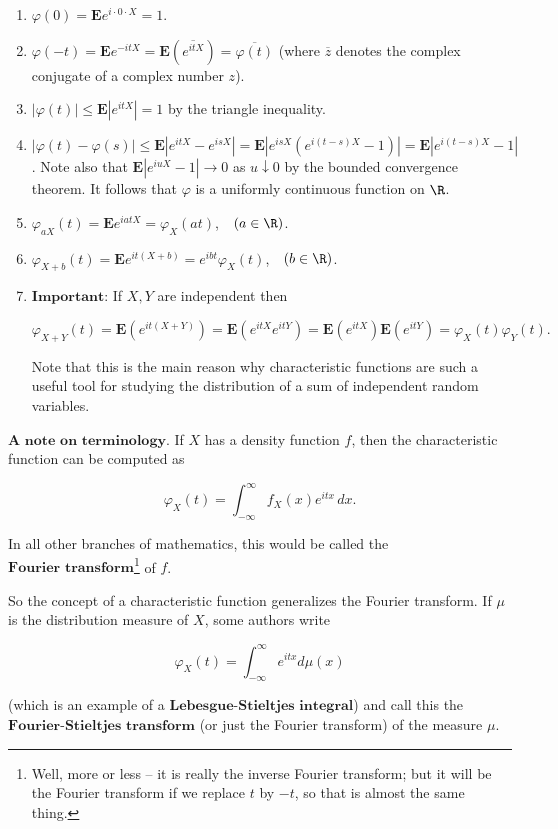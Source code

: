 \begin{enumerate}[label=\arabic*.]
\item $\varphi(0) = \mathbf{E} e^{i\cdot 0\cdot X} = 1$.

\item $\varphi(-t) = \mathbf{E} e^{-i t X} = \mathbf{E}
\left(\overline{e^{it X}}\right) =
\overline{\varphi(t)}$
(where $\overline{z}$ denotes the complex conjugate
of a complex number $z$).

\item $|\varphi(t)| \le \mathbf{E}\left|e^{i t X}\right| =
1$
by the triangle inequality.

\item $|\varphi(t)-\varphi(s)| \le \mathbf{E} \left| e^{i t
X} - e^{isX}\right| = \mathbf{E} \left|e^{i s X}
\left(e^{i(t-s)X}-1\right)\right| = \mathbf{E} \left|
e^{i(t-s)X}-1\right|$.
Note also that
$\mathbf{E} \left|e^{i u X}-1\right|\to 0$ as
$u \downarrow 0$ by the bounded convergence theorem.
It follows that $\varphi$ is a uniformly continuous
function on $\R$.

\item $\varphi_{a X}(t) = \mathbf{E} e^{i a t X} =
\varphi_X(a t)$,\
\ $(a\in\R)$.

\item $\varphi_{X+b}(t) = \mathbf{E} e^{i t (X+b)} = e^{i b
t} \varphi_X(t)$,\
\ $(b\in\R)$.

\item $\textbf{Important:}$ If $X,Y$ are independent then

\[
\varphi_{X+Y}(t) = \mathbf{E}\left(e^{it(X+Y)}\right)
= \mathbf{E}\left(e^{itX} e^{itY}\right) = \mathbf{E}\left(e^{itX}\right) \mathbf{E} \left(e^{itY}\right) = \varphi_X(t) \varphi_Y(t).
\]

\noindent Note that this is the main reason why characteristic
functions are such a useful tool for studying the
distribution of a sum of independent random variables.
\end{enumerate}

\noindent $\textbf{A note on terminology.}$ If $X$ has a
density function $f$, then the characteristic
function can be computed as

\[
\varphi_X(t) = \int_{-\infty}^\infty f_X(x) e^{itx}\,dx.
\]

\noindent In all other branches of mathematics, this would be
called the
$\textbf{Fourier transform}$\footnote{Well, more or less -- it is really the inverse
Fourier transform; but it will be the Fourier
transform if we replace $t$ by $-t$, so that is
almost the same thing.}
of $f$.

So the concept of a characteristic function
generalizes the Fourier transform. If $\mu$ is the
distribution measure of $X$, some authors write

\[
\varphi_X(t) = \int_{-\infty}^\infty e^{itx} d\mu(x)
\]

\noindent (which is an example of a
$\textbf{Lebesgue-Stieltjes integral}$) and call this
the $\textbf{Fourier-Stieltjes transform}$ (or just
the Fourier transform) of the measure $\mu$.
